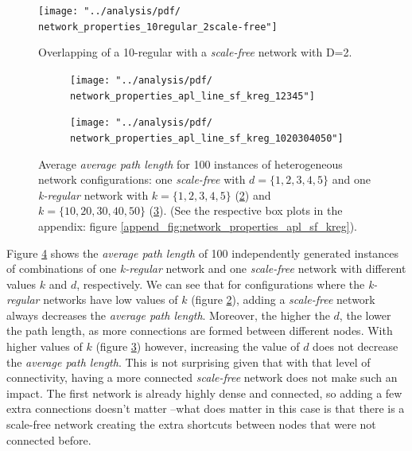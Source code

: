 \documentclass[preprint,number]{elsarticle}
\begin{document}
\begin{figure}[H]
	\centering
	\texttt{[image: "../analysis/pdf/ network\_properties\_10regular\_2scale-free"]}
	\begin{minipage}{0.9\textwidth}
		\caption{Overlapping of a 10-regular with a \textit{scale-free} network with D=2.}
		\label{fig:network_properties_merge_regular_scale-free}
	\end{minipage}
\end{figure}

\begin{figure}[H]
	\centering
	\begin{subfigure}{.5\linewidth}
		\centering
		\texttt{[image: "../analysis/pdf/ network\_properties\_apl\_line\_sf\_kreg\_12345"]}
		\caption{}
		\label{fig:network_properties_apl_line_sf__kreg_12345}
	\end{subfigure}%
	\begin{subfigure}{.5\linewidth}
		\centering
		\texttt{[image: "../analysis/pdf/ network\_properties\_apl\_line\_sf\_kreg\_1020304050"]}
		\caption{}
		\label{fig:network_properties_apl_line_sf_kreg_1020304050}
	\end{subfigure}
	\begin{minipage}{0.9\textwidth}
		\vspace{0.2cm}
		\caption{Average \textit{average path  length} for 100 instances of heterogeneous network configurations:  one \textit{scale-free} with $d=\{1,2,3,4,5\}$ and one \textit{k-regular} network with $k=\{1,2,3,4,5\}$ (\ref{fig:network_properties_apl_line_sf__kreg_12345}) and $k=\{10,20,30,40,50\}$ (\ref{fig:network_properties_apl_line_sf_kreg_1020304050}). (See the respective box plots in the appendix: figure \ref{append_fig:network_properties_apl_sf_kreg}).}
		\label{fig:network_properties_line_apl_sf_kreg}
	\end{minipage}
\end{figure}

Figure \ref{fig:network_properties_line_apl_sf_kreg} shows the \textit{average path length} of 100 independently generated instances of combinations of one \textit{k-regular} network and one \textit{scale-free} network with different values $k$ and $d$, respectively. We can see that for configurations where the \textit{k-regular} networks have low values of $k$ (figure \ref{fig:network_properties_apl_line_sf__kreg_12345}), adding a \textit{scale-free} network always decreases the \textit{average path length}. Moreover, the higher the $d$, the lower the path length, as more connections are formed between different nodes. With higher values of $k$ (figure \ref{fig:network_properties_apl_line_sf_kreg_1020304050}) however, increasing the value of $d$ does not decrease the \textit{average path length}. This is not surprising given that with that level of connectivity, having a more connected \textit{scale-free} network does not make such an impact. The first network is already highly dense and connected, so adding a few extra connections doesn't matter --what does matter in this case is that there is a scale-free network creating the extra shortcuts between nodes that were not connected before.
\end{document}
